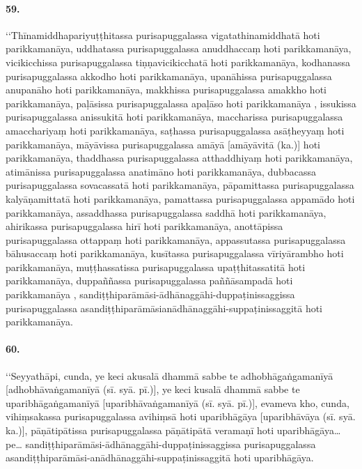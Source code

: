 \paragraph{59.} ‘‘Thīnamiddhapariyuṭṭhitassa purisapuggalassa vigatathinamiddhatā hoti parikkamanāya, uddhatassa purisapuggalassa anuddhaccaṃ hoti parikkamanāya, vicikicchissa purisapuggalassa tiṇṇavicikicchatā hoti parikkamanāya, kodhanassa purisapuggalassa akkodho hoti parikkamanāya, upanāhissa purisapuggalassa anupanāho hoti parikkamanāya, makkhissa purisapuggalassa amakkho hoti parikkamanāya, paḷāsissa purisapuggalassa apaḷāso hoti parikkamanāya , issukissa purisapuggalassa anissukitā hoti parikkamanāya, maccharissa purisapuggalassa amacchariyaṃ hoti parikkamanāya, saṭhassa purisapuggalassa asāṭheyyaṃ hoti parikkamanāya, māyāvissa purisapuggalassa amāyā [amāyāvitā (ka.)] hoti parikkamanāya, thaddhassa purisapuggalassa atthaddhiyaṃ hoti parikkamanāya, atimānissa purisapuggalassa anatimāno hoti parikkamanāya, dubbacassa purisapuggalassa sovacassatā hoti parikkamanāya, pāpamittassa purisapuggalassa kalyāṇamittatā hoti parikkamanāya, pamattassa purisapuggalassa appamādo hoti parikkamanāya, assaddhassa purisapuggalassa saddhā hoti parikkamanāya, ahirikassa purisapuggalassa hirī hoti parikkamanāya, anottāpissa purisapuggalassa ottappaṃ hoti parikkamanāya, appassutassa purisapuggalassa bāhusaccaṃ hoti parikkamanāya, kusītassa purisapuggalassa vīriyārambho hoti parikkamanāya, muṭṭhassatissa purisapuggalassa upaṭṭhitassatitā hoti parikkamanāya, duppaññassa purisapuggalassa paññāsampadā hoti parikkamanāya , sandiṭṭhiparāmāsi-ādhānaggāhi-duppaṭinissaggissa purisapuggalassa asandiṭṭhiparāmāsianādhānaggāhi-suppaṭinissaggitā hoti parikkamanāya.

\paragraph{60.} ‘‘Seyyathāpi, cunda, ye keci akusalā dhammā sabbe te adhobhāgaṅgamanīyā [adhobhāvaṅgamanīyā (sī. syā. pī.)], ye keci kusalā dhammā sabbe te uparibhāgaṅgamanīyā [uparibhāvaṅgamanīyā (sī. syā. pī.)], evameva kho, cunda, vihiṃsakassa purisapuggalassa avihiṃsā hoti uparibhāgāya [uparibhāvāya (sī. syā. ka.)], pāṇātipātissa purisapuggalassa pāṇātipātā veramaṇī hoti uparibhāgāya…pe… sandiṭṭhiparāmāsi-ādhānaggāhi-duppaṭinissaggissa purisapuggalassa asandiṭṭhiparāmāsi-anādhānaggāhi-suppaṭinissaggitā hoti uparibhāgāya.

